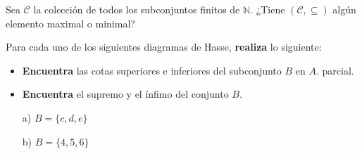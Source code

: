 \documentclass[oneside]{style}
\begin{document}
\begin{questions}[label=\protect\circled{\bfseries\arabic*}]
    \question
    {
        Sea $\mathcal{C}$ la colección de todos los subconjuntos finitos de 
        $\mathbb{N}$. ¿Tiene $(\mathcal{C}, \subseteq)$ algún elemento 
        maximal o minimal?
    }

    \question
    {
        Para cada uno de los siguientes diagramas de Hasse, \textbf{realiza} 
        lo siguiente:
        \begin{itemize}
            \item \textbf{Encuentra} las cotas superiores e inferiores del
            subconjunto $B$ en $A$. 
            parcial. 
            \item \textbf{Encuentra} el supremo y el ínfimo del conjunto $B$.
        \end{itemize}

        \begin{multicols}{3}
            \begin{itemize}
                \item[a)] $B = \{c,d,e\}$
                

                \columnbreak
    
                \item[b)] $B = \{4,5,6\}$


\end{itemize}
\end{multicols}}
\end{questions}
\end{document}
